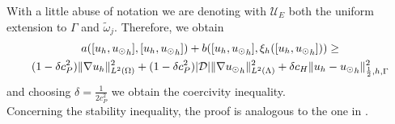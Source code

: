 With a little abuse of notation we are denoting with $\mathcal{U}_E$ both the uniform extension to $\Gamma$ and $\tilde{\omega}_j$. Therefore, we obtain
\begin{multline*}
a([u_h, {u_{\odot}}_h],[u_h, {u_{\odot}}_h] ) + b([u_h, {u_{\odot}}_h], \xi_h([u_h, {u_{\odot}}_h]))
\geq \\
(1-\delta c_P^2) \|\nabla u_h\|^2_{L^2(\Omega)} + (1- \delta c_P^2) |\mathcal{D}|\|\nabla {u_{\odot}}_h\|^2_{L^2(\Lambda)}
+\delta c_H \|u_h-{u_{\odot}}_h\|^2_{\frac 12,h,\Gamma}
\end{multline*}
and choosing $\delta=\frac{1}{2c_P^2}$ we obtain the coercivity inequality.\\
Concerning the stability inequality, the proof is analogous to the one in \cite{burman2014}.

